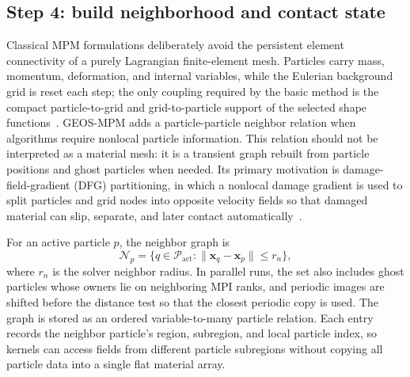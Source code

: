 \subsection{Step 4: build neighborhood and contact state}
\label{subsec:solver-step-4}
Classical MPM formulations deliberately avoid the persistent element connectivity of a purely Lagrangian finite-element mesh.  Particles carry mass, momentum, deformation, and internal variables, while the Eulerian background grid is reset each step; the only coupling required by the basic method is the compact particle-to-grid and grid-to-particle support of the selected shape functions~\cite{sulsky1994history,bardenhagen2004gimp}.  GEOS-MPM adds a particle-particle neighbor relation when algorithms require nonlocal particle information.  This relation should not be interpreted as a material mesh: it is a transient graph rebuilt from particle positions and ghost particles when needed.  Its primary motivation is damage-field-gradient (DFG) partitioning, in which a nonlocal damage gradient is used to split particles and grid nodes into opposite velocity fields so that damaged material can slip, separate, and later contact automatically~\cite{homel2016dfg}.

For an active particle $p$, the neighbor graph is
\begin{equation}
  \mathcal{N}_p = \{q\in\mathcal{P}_{\mathrm{act}} : \|\mathbf{x}_q-\mathbf{x}_p\| \le r_n\},
\end{equation}
where $r_n$ is the solver neighbor radius.  In parallel runs, the set also includes ghost particles whose owners lie on neighboring MPI ranks, and periodic images are shifted before the distance test so that the closest periodic copy is used.  The graph is stored as an ordered variable-to-many particle relation.  Each entry records the neighbor particle's region, subregion, and local particle index, so kernels can access fields from different particle subregions without copying all particle data into a single flat material array.

